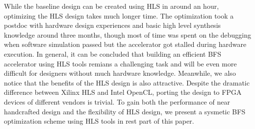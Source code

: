 While the baseline design can be created using HLS in around an hour, optimizing the 
HLS design takes much longer time. The optimization took a postdoc with hardware design experiences 
and basic high level synthesis knowledge around three months, though most of time was 
spent on the debugging when software simulation passed but the accelerator got stalled 
during hardware execution. In general, it can be concluded that building an efficient BFS 
accelerator using HLS tools remians a challenging task and will be even more difficult for 
designers without much hardware knowledge. Meanwhile, we also notice that the benefits of 
the HLS design is also attractive. Despite the dramatic difference between Xilinx HLS 
and Intel OpenCL, porting the design to FPGA devices of different vendors is trivial. 
To gain both the performance of near handcrafted design and the flexibility of HLS design, 
we present a sysmetic BFS optimization scheme using HLS tools in rest part of this paper.
